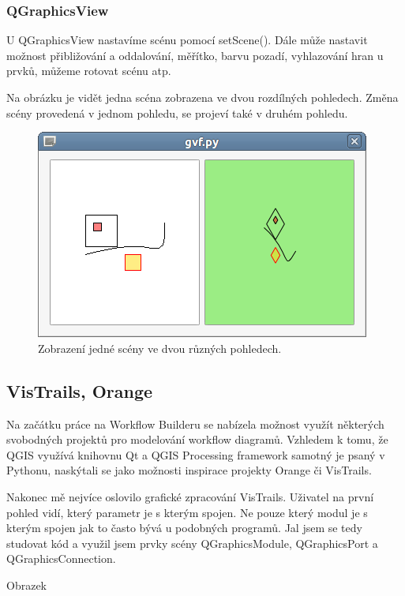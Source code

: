 \subsubsection*{QGraphicsView}
U QGraphicsView nastavíme scénu pomocí setScene(). Dále může nastavit možnost přibližování a oddalování, měřítko, barvu pozadí, vyhlazování hran u prvků, můžeme rotovat scénu atp.

Na obrázku je vidět jedna scéna zobrazena ve dvou rozdílných pohledech. Změna scény provedená v jednom pohledu, se projeví také v druhém pohledu.

\begin{figure}[h]
	\centering
	\includegraphics[scale=0.7]{pictures/qt/gsf}
	\caption{Zobrazení jedné scény ve dvou různých pohledech.}
	\label{gsf}
\end{figure}


\subsection{VisTrails, Orange}
Na začátku práce na Workflow Builderu se nabízela možnost využít některých svobodných projektů pro modelování workflow diagramů. Vzhledem k tomu, že QGIS využívá knihovnu Qt a QGIS Processing framework samotný je psaný  v Pythonu, naskýtali se jako možnosti inspirace projekty Orange či VisTrails.

Nakonec mě nejvíce oslovilo grafické zpracování VisTrails. Uživatel na první pohled vidí, který parametr je s kterým spojen. Ne pouze který modul je s kterým spojen jak to často bývá u podobných programů. Jal jsem se tedy studovat kód a využil jsem prvky scény QGraphicsModule, QGraphicsPort a QGraphicsConnection.

Obrazek

